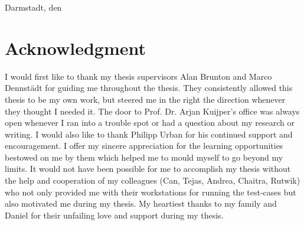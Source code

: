 \documentclass[type=msc,colorback,accentcolor=tud1d,bigchapter]{tudthesis}
\begin{document}
\noindent Darmstadt, den \date{\today}  \hspace{8.5cm} \author{Suman Bidarahalli}
\newpage

\chapter*{Acknowledgment}
I would first like to thank my thesis supervisors Alan Brunton and Marco Dennst{\"a}dt for guiding me throughout the thesis. They consistently allowed this thesis to be my own work, but steered me in the right the direction whenever they thought I needed it. The door to Prof. Dr. Arjan Kuijper's office was always open whenever I ran into a trouble spot or had a question about my research or writing. I would also like to thank Philipp Urban for his continued support and encouragement. I offer my sincere appreciation for the learning opportunities bestowed on me by them which helped me to mould myself to go beyond my limits. It would not have been possible for me to accomplish my thesis without the help and cooperation of my colleagues (Can, Tejas, Andrea, Chaitra, Rutwik) who not only provided me with their workstations for running the test-cases but also motivated me during my thesis. My heartiest thanks to my family and Daniel for their unfailing love and support during my thesis. 
\newpage

\tableofcontents
\newpage
\listoffigures
\newpage
\lstlistoflistings
\newpage
\listoftables
\newpage


\newpage

\newpage

\newpage

\newpage

\newpage

\newpage

\newpage

\newpage
\printbibliography
\end{document}
